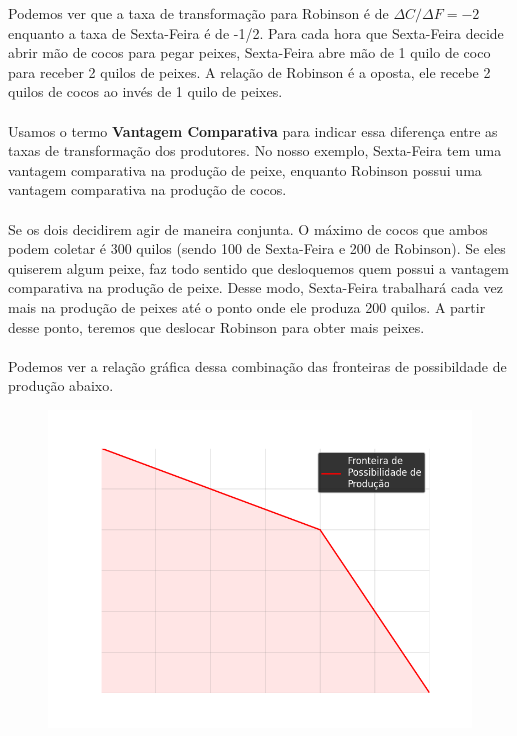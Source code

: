 \documentclass[a4paper,11pt,oneside]{book}
\theoremstyle{definition}
\theoremstyle{break}
\begin{document}
Podemos ver que a taxa de transformação para Robinson é de $\Delta C / \Delta F = -2$ enquanto a taxa de Sexta-Feira é de -1/2. Para cada hora que Sexta-Feira decide abrir mão de cocos para pegar peixes, Sexta-Feira abre mão de 1 quilo de coco para receber 2 quilos de peixes. A relação de Robinson é a oposta, ele recebe 2 quilos de cocos ao invés de 1 quilo de peixes.
\\~\\
Usamos o termo \textbf{Vantagem Comparativa} para indicar essa diferença entre as taxas de transformação dos produtores. No nosso exemplo, Sexta-Feira tem uma vantagem comparativa na produção de peixe, enquanto Robinson possui uma vantagem comparativa na produção de cocos. 
\\~\\
Se os dois decidirem agir de maneira conjunta. O máximo de cocos que ambos podem coletar é 300 quilos (sendo 100 de Sexta-Feira e 200 de Robinson). Se eles quiserem algum peixe, faz todo sentido que desloquemos quem possui a vantagem comparativa na produção de peixe. Desse modo, Sexta-Feira trabalhará cada vez mais na produção de peixes até o ponto onde ele produza 200 quilos. A partir desse ponto, teremos que deslocar Robinson para obter mais peixes.
\\~\\
Podemos ver a relação gráfica dessa combinação das fronteiras de possibildade de produção abaixo.

\begin{figure}[H]
	\centering
	\includegraphics[scale=0.6]{cap33_10-pos_prod2.png}
\end{figure}
\end{document}
